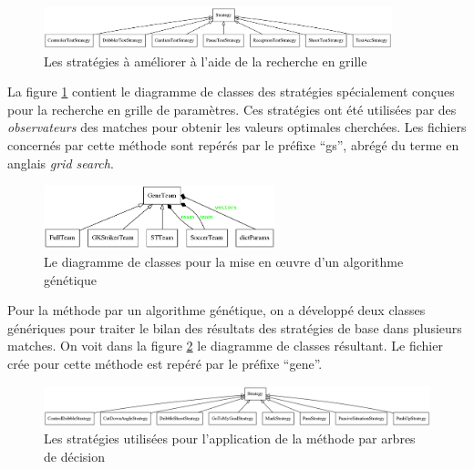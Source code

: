 \documentclass[12pt,a4paper]{article}
\begin{document}
\begin{figure}[!h]
  \centering
  \captionsetup{justification=centering}
  \includegraphics[width=0.9\textwidth]{gridSearch}
  \caption[Les strat\'egies pour la recherche en grille]{Les strat\'egies \`a 
am\'eliorer \`a l'aide de la recherche en grille}
  \label{fig:gs}
\end{figure}

La figure \ref{fig:gs} contient le diagramme de classes des strat\'egies 
sp\'ecialement con\c{c}ues pour la recherche en grille de param\`etres. Ces 
strat\'egies ont \'et\'e utilis\'ees par des {\itshape observateurs} des 
matches pour obtenir les valeurs optimales cherch\'ees. Les fichiers 
concern\'es par cette m\'ethode sont rep\'er\'es par le pr\'efixe 
\enquote{gs}, abr\'eg\'e du terme en anglais {\itshape grid search}.

\begin{figure}[!h]
  \centering
  \captionsetup{justification=centering}
  \includegraphics[width=0.6\textwidth]{genetic}
  \caption[Les classes pour l'algorithme g\'en\'etique]{Le diagramme de 
	classes pour la mise en \oe uvre d'un algorithme g\'en\'etique}
  \label{fig:gene}
\end{figure}

Pour la m\'ethode par un algorithme g\'en\'etique, on a d\'evelopp\'e deux 
classes g\'en\'eriques pour traiter le bilan des r\'esultats des strat\'egies 
de base dans plusieurs matches. On voit dans la figure \ref{fig:gene} le 
diagramme de classes r\'esultant. Le fichier cr\'ee pour cette m\'ethode 
est rep\'er\'e par le pr\'efixe \enquote{gene}.

\begin{figure}[!h]
  \centering
  \captionsetup{justification=centering}
  \includegraphics[width=1.\textwidth]{decisionTree}
  \caption[Les strat\'egies pour l'arbre de d\'ecision]{Les strat\'egies 
utilis\'ees pour l'application de la m\'ethode par arbres de d\'ecision}
  \label{fig:dt}
\end{figure}
\end{document}
